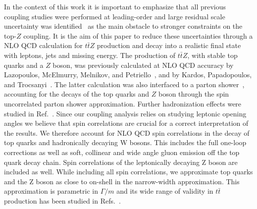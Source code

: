 \documentclass[preprint]{JHEP3} %
\def\Dphill{\Delta \phi_{ll}}
\def\ttbZ{t\bar{t}Z}
\def\ttb{t\bar{t}}
\def\ptZ{p_{t,Z}}
\begin{document}
In the context of this work it is important to emphasize that all previous coupling studies were performed at leading-order and large residual scale uncertainty 
was identified~\cite{Baur:2004uw} as the main obstacle to stronger constraints on the top-$Z$ coupling.
It is the aim of this paper to reduce these uncertainties through a NLO QCD calculation for $\ttbZ$ production and decay into a realistic final state with leptons, jets and missing energy.
The production of $\ttbZ$, with stable top quarks and a $Z$ boson, was previously calculated at NLO QCD accuracy by 
Lazopoulos, McElmurry, Melnikov, and Petriello~\cite{Lazopoulos:2008de}, and  by Kardos, Papadopoulos, and Trocsanyi~\cite{Kardos:2011na}.
The latter calculation was also interfaced to a parton shower~\cite{Garzelli:2011is}, accounting for the decays of the top quarks and $Z$ boson through 
the spin uncorrelated parton shower approximation.
Further hadronization effects were studied in Ref.~\cite{Garzelli:2012bn}.
Since our coupling analysis relies on studying leptonic opening angles we believe that spin correlations are crucial for a correct interpretation of the results.
We therefore account for NLO QCD spin correlations in the decay of top quarks and hadronically decaying W bosons.
This includes the full one-loop corrections as well as soft, collinear and wide angle gluon emission off the top quark decay chain.
Spin correlations of the leptonically decaying Z boson are included as well.
While including all spin correlations, we approximate top quarks and the Z boson as close to on-shell in the narrow-width approximation.
This approximation is parametric in $\Gamma/m$ and its wide range of validity in $\ttb$ production has been studied in Refs.~\cite{}.
\end{document}
